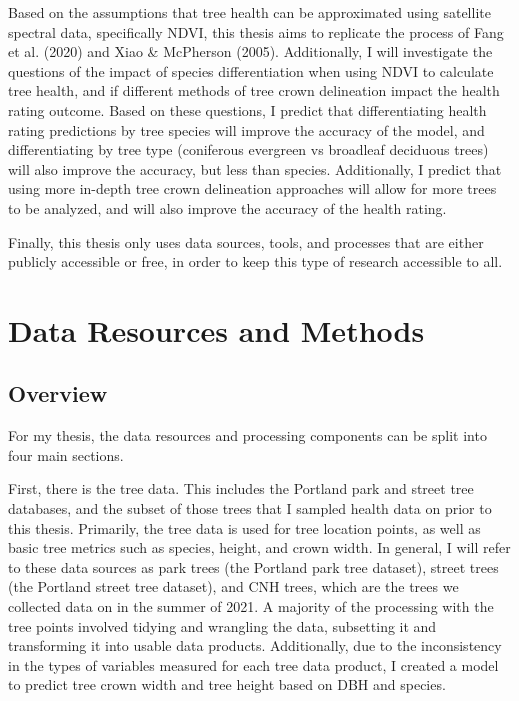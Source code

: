 \documentclass[12pt,twoside]{reedthesis}
\begin{document}
Based on the assumptions that tree health can be approximated using satellite spectral data, specifically NDVI, this thesis aims to replicate the process of Fang et al. (2020) and Xiao \& McPherson (2005). Additionally, I will investigate the questions of the impact of species differentiation when using NDVI to calculate tree health, and if different methods of tree crown delineation impact the health rating outcome. Based on these questions, I predict that differentiating health rating predictions by tree species will improve the accuracy of the model, and differentiating by tree type (coniferous evergreen vs broadleaf deciduous trees) will also improve the accuracy, but less than species. Additionally, I predict that using more in-depth tree crown delineation approaches will allow for more trees to be analyzed, and will also improve the accuracy of the health rating.

Finally, this thesis only uses data sources, tools, and processes that are either publicly accessible or free, in order to keep this type of research accessible to all.

\hypertarget{data-methods}{%
\chapter{Data Resources and Methods}\label{data-methods}}

\hypertarget{overview}{%
\section{Overview}\label{overview}}

For my thesis, the data resources and processing components can be split into four main sections.

First, there is the tree data. This includes the Portland park and street tree databases, and the subset of those trees that I sampled health data on prior to this thesis. Primarily, the tree data is used for tree location points, as well as basic tree metrics such as species, height, and crown width. In general, I will refer to these data sources as park trees (the Portland park tree dataset), street trees (the Portland street tree dataset), and CNH trees, which are the trees we collected data on in the summer of 2021. A majority of the processing with the tree points involved tidying and wrangling the data, subsetting it and transforming it into usable data products. Additionally, due to the inconsistency in the types of variables measured for each tree data product, I created a model to predict tree crown width and tree height based on DBH and species.
\end{document}
